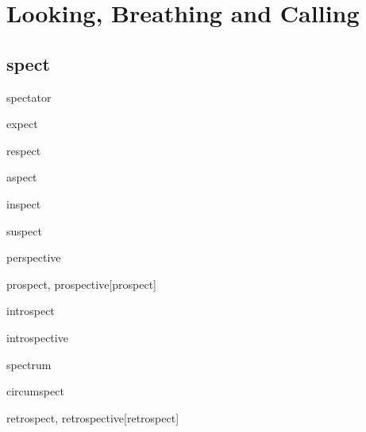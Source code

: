 \chapter{Looking, Breathing and Calling}

\section{spect}

\begin{wordRef}{spectator}
\end{wordRef}

\begin{wordRef}{expect}
\end{wordRef}

\begin{wordRef}{respect}
\end{wordRef}

\begin{wordRef}{aspect}
\end{wordRef}

\begin{wordRef}{inspect}
\end{wordRef}

\begin{wordRef}{suspect}
\end{wordRef}

\begin{wordRef}{perspective}
\end{wordRef}

\begin{wordRef}{prospect, prospective}[prospect]
\end{wordRef}

\begin{wordRef}{introspect}
\end{wordRef}

\begin{wordRef}{introspective}
\end{wordRef}

\begin{wordRef}{spectrum}
\end{wordRef}

\begin{wordRef}{circumspect}
\end{wordRef}

\begin{wordRef}{retrospect, retrospective}[retrospect]
\end{wordRef}

